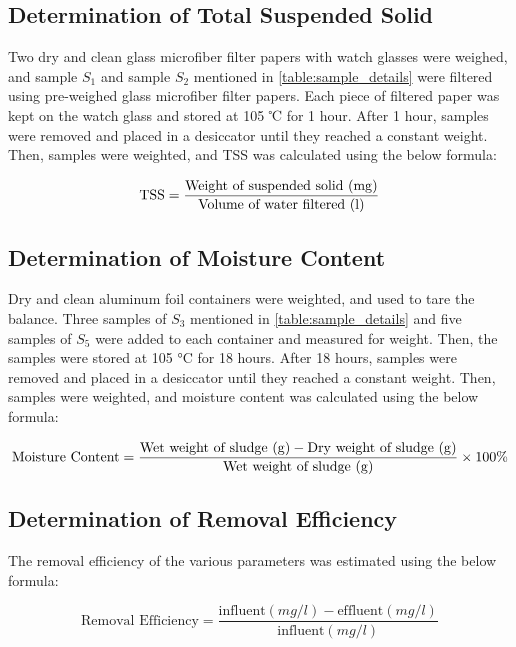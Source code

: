 \subsection{Determination of Total Suspended Solid}
Two dry and clean glass microfiber filter papers with watch glasses were weighed, and sample $S_1$ and sample $S_2$ mentioned in \cref{table:sample_details} were filtered using pre-weighed glass microfiber filter papers. Each piece of filtered paper was kept on the watch glass and stored at 105 ℃ for 1 hour. After 1 hour, samples were removed and placed in a desiccator until they reached a constant weight. Then, samples were weighted, and \ac{TSS} was calculated using the below formula:

\begin{equation}
    \text{TSS} = \dfrac{\text{Weight of suspended solid (\unit{mg})}}{\text{Volume of water filtered (\unit{l})}}
\end{equation}

\subsection{Determination of Moisture Content}
Dry and clean aluminum foil containers were weighted, and used to tare the balance. Three samples of $S_3$ mentioned in \cref{table:sample_details} and five samples of $S_5$  were added to each container and measured for weight. Then, the samples were stored at 105 °C for 18 hours. After 18 hours, samples were removed and placed in a desiccator until they reached a constant weight. Then, samples were weighted, and moisture content was calculated using the below formula:

\begin{equation}
    \text{Moisture Content} = \dfrac{\text{Wet weight of sludge (\unit{g})} - \text{Dry weight of sludge (\unit{g})}}{\text{Wet weight of sludge (\unit{g})}} \times 100\%
\end{equation}

\subsection{Determination of Removal Efficiency}
The removal efficiency of the various parameters was estimated using the below formula:

\begin{equation}
    \text{Removal Efficiency} = \dfrac{\text{influent} \left( \unit{mg/l} \right) - \text{effluent} \left( \unit{mg/l} \right) }{\text{influent} \left( \unit{mg/l} \right)}
\end{equation}

